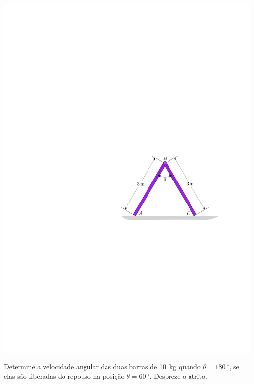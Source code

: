 \begin{minipage}{.6\linewidth}
	\begin{flushright}
		\includegraphics[scale=1.1]{../../images/draw_3_2}
	\end{flushright}
\end{minipage}
\begin{minipage}{.4\linewidth}
	\item Determine a velocidade angular das duas barras de \SI{10}{\kilogram} quando $\theta=\SI{180}{^{\circ}}$, se elas são liberadas do repouso na posição $\theta=\SI{60}{^{\circ}}$. Despreze o atrito.
\end{minipage}